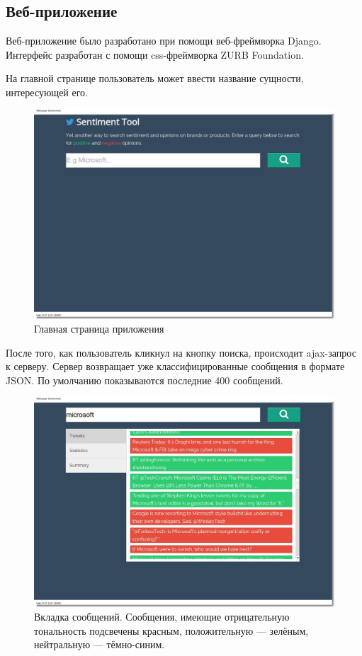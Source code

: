 \subsection{Веб-приложение}
Веб-приложение было разработано при помощи веб-фреймворка Django.
Интерфейс разработан с помощи css-фреймворка ZURB Foundation.

На главной странице пользователь может ввести название
сущности, интересующей его. 
\begin{figure}[!ht]
\begin{center}
\includegraphics[scale=0.4, trim=20mm 60mm 20mm 10mm, clip]{../resources/screens/main.png}
\caption{Главная страница приложения}
\label{gr:mainpage}
\end{center}
\end{figure} 


После того, как пользователь кликнул на кнопку поиска, происходит ajax-запрос
к серверу. Сервер возвращает уже классифицированные сообщения в 
формате JSON. По умолчанию показываются последние 400 сообщений.

\begin{figure}[!ht]
\begin{center}
\includegraphics[scale=0.4, trim=20mm 60mm 20mm 10mm, clip]{../resources/screens/tweets.png}
\caption{Вкладка сообщений. Сообщения, имеющие отрицательную тональность подсвечены красным, положительную --- зелёным, нейтральную --- тёмно-синим.}
\label{gr:messages}
\end{center}
\end{figure} 


